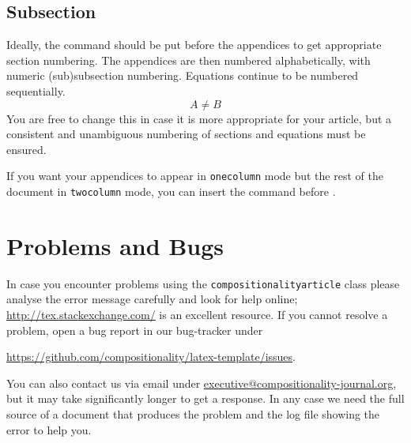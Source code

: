 \documentclass[a4paper,onecolumn,superscriptaddress,10pt,issue=1, volume=2, shorttitle=papers]{compositionalityarticle}
\begin{document}
\subsection{Subsection}
Ideally, the command \texttt{\string\appendix} should be put before the appendices to get appropriate section numbering.
The appendices are then numbered alphabetically, with numeric (sub)subsection numbering.
Equations continue to be numbered sequentially.
\begin{equation}
  A \neq B
\end{equation}
You are free to change this in case it is more appropriate for your article, but a consistent and unambiguous numbering of sections and equations must be ensured.

If you want your appendices to appear in \texttt{onecolumn} mode but the rest of the document in \texttt{twocolumn} mode, you can insert the command \texttt{\string\onecolumn\string\newpage} before \texttt{\string\appendix}.   

\section{Problems and Bugs}
In case you encounter problems using the \texttt{compositionalityarticle} class please analyse the error message carefully and look for help online; \href{http://tex.stackexchange.com/}{http://tex.stackexchange.com/} is an excellent resource.
If you cannot resolve a problem,  open a bug report in our bug-tracker under 
\begin{center}
  \href{https://github.com/compositionality/issues}{https://github.com/compositionality/latex-template/issues}.
\end{center}

You can also contact us via email under \href{executive-board@compositionality-journal.org}{executive@compositionality-journal.org}, but it may take significantly longer to get a response.
In any case we need the full source of a document that produces the problem and the log file showing the error to help you.
\end{document}
